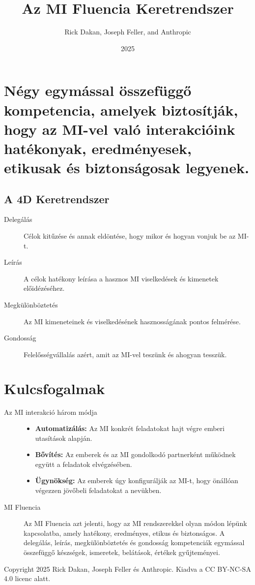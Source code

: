 \documentclass[a4paper, 11pt]{article}
\makeatletter
\renewcommand{\maketitle}{
  \begin{center}
    {\fontsize{22}{26}\bfseries\color{primary}\@title}
    \vspace{0.5em}
    {\color{lightgray}\titlerule[3pt]}
    \vspace{1.5em}
  \end{center}
}
\makeatother
\begin{document}
\title{Az MI Fluencia Keretrendszer}
\author{Rick Dakan, Joseph Feller, and Anthropic}
\date{2025}
\maketitle

\section*{Négy egymással összefüggő kompetencia, amelyek biztosítják, hogy az MI-vel való interakcióink hatékonyak, eredményesek, etikusak és biztonságosak legyenek.}

\subsection*{A 4D Keretrendszer}
\begin{description}
    \item[Delegálás] Célok kitűzése és annak eldöntése, hogy mikor és hogyan vonjuk be az MI-t.
    \item[Leírás] A célok hatékony leírása a hasznos MI viselkedések és kimenetek előidézéséhez.
    \item[Megkülönböztetés] Az MI kimeneteinek és viselkedésének hasznosságának pontos felmérése.
    \item[Gondosság] Felelősségvállalás azért, amit az MI-vel teszünk és ahogyan tesszük.
\end{description}

\section*{Kulcsfogalmak}
\begin{description}
    \item[Az MI interakció három módja]
    \begin{itemize}
        \item \textbf{Automatizálás:} Az MI konkrét feladatokat hajt végre emberi utasítások alapján.
        \item \textbf{Bővítés:} Az emberek és az MI gondolkodó partnerként működnek együtt a feladatok elvégzésében.
        \item \textbf{Ügynökség:} Az emberek úgy konfigurálják az MI-t, hogy önállóan végezzen jövőbeli feladatokat a nevükben.
    \end{itemize}
    \item[MI Fluencia] Az MI Fluencia azt jelenti, hogy az MI rendszerekkel olyan módon lépünk kapcsolatba, amely hatékony, eredményes, etikus és biztonságos. A delegálás, leírás, megkülönböztetés és gondosság kompetenciák egymással összefüggő készségek, ismeretek, belátások, értékek gyűjteményei.
\end{description}

\vspace{\fill}
\begin{center}
    \small{Copyright 2025 Rick Dakan, Joseph Feller és Anthropic. Kiadva a CC BY-NC-SA 4.0 licenc alatt.}
\end{center}
\end{document}
